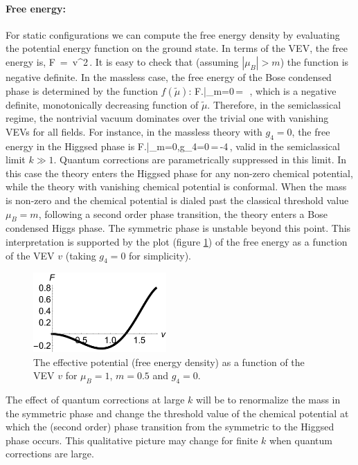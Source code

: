  \paragraph{Free energy:} For static configurations  we can compute the free energy density by evaluating the potential energy function on the ground state.   In terms of the VEV, the free energy is,
 \be
F \,=\, v^2\,.
 \ee
 It is easy to check that (assuming $|\mu_B| > m$) the function is negative definite.
 In the massless case, the free energy of the Bose condensed phase is determined by the function $f(\tilde\mu)$:
 \be
 F\left.\right|_{m=0}\,=\, \,,
 \ee
 which is a negative definite, monotonically decreasing function of $\tilde\mu$. Therefore, in the semiclassical regime, the nontrivial vacuum dominates over the trivial one with vanishing VEVs for all fields. For instance, in the massless theory with $g_4=0$, the free energy in the Higgsed phase is
 \be
 F\left.\right|_{m=0,g_4=0}\,=\,-4\,,
 \ee
  valid in the semiclassical limit $k\gg 1$. Quantum corrections are parametrically suppressed in this limit. In this case the theory enters the Higgsed phase for any non-zero chemical potential, while the theory with vanishing chemical potential is conformal.   When the mass is non-zero and the chemical potential is dialed past the classical threshold value $\mu_B=m$, following a second order phase transition, the theory enters a Bose condensed Higgs phase.   The symmetric phase is unstable beyond this point. This interpretation is supported by the plot (figure \ref{fvsv}) of the free energy as a function of the VEV $v$ (taking $g_4=0$ for simplicity).
   \begin{figure}[h]
\begin{center}
\includegraphics[width=2in]{Chapter_3_Folder_1806.06976/figures/Fvsv.pdf}
\end{center}
\caption{ The effective potential (free energy density) as a function of the VEV $v$ for $\mu_B=1$, $m=0.5$ and $g_4=0$.
}
\label{fvsv}
\end{figure}
The effect of  quantum corrections at large $k$ will be to renormalize the mass  in the symmetric phase and change the threshold value of the chemical potential at which the (second order) phase transition from the symmetric to the Higgsed phase occurs. This qualitative picture may change for finite $k$ when quantum corrections are large.

